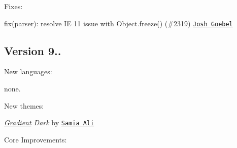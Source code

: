 Fixes\+:


\begin{DoxyItemize}
\item fix(parser)\+: resolve IE 11 issue with Object.\+freeze() (\#2319) \href{https://github.com/yyyc514}{\tt Josh Goebel}
\end{DoxyItemize}

\subsection*{Version 9..}

New languages\+:


\begin{DoxyItemize}
\item none.
\end{DoxyItemize}

New themes\+:


\begin{DoxyItemize}
\item {\itshape \hyperlink{class_gradient}{Gradient} Dark} by \href{https://github.com/samiaab1990}{\tt Samia Ali}
\end{DoxyItemize}

Core Improvements\+:



